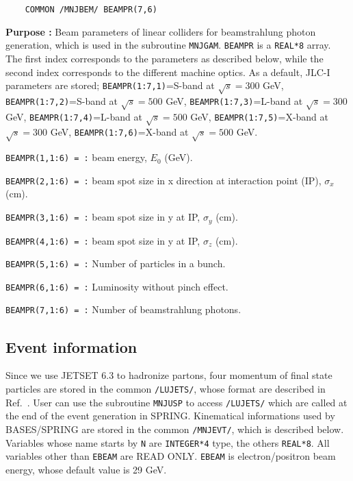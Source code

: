 %
%
\newlength{\MNJBEM}
\settowidth{\MNJBEM}{\tt   COMMON /MNJBEM/ BEAMPR(7,6)}
\begin{verbatim}
    COMMON /MNJBEM/ BEAMPR(7,6)
\end{verbatim}
\vspace{-28pt}
\hspace*{4ex}\fbox{\rule[14pt]{\MNJBEM}{0cm}}
\begin{list}{ }{\parsep=0pt \itemsep=0pt \topsep=0pt }
\item[\bf Purpose :] Beam parameters of linear colliders for
beamstrahlung photon generation,
which is used in the subroutine {\tt MNJGAM}. {\tt BEAMPR} is 
a {\tt REAL*8} array.  The first index corresponds to the parameters as
described below, while the second index corresponds to the different
machine optics.  As a default, JLC-I\cite{JLCI} parameters are
stored; {\tt BEAMPR(1:7,1)}=S-band at $\sqrt{s}=300$ GeV,
{\tt BEAMPR(1:7,2)}=S-band at $\sqrt{s}=500$ GeV,
{\tt BEAMPR(1:7,3)}=L-band at $\sqrt{s}=300$ GeV,
{\tt BEAMPR(1:7,4)}=L-band at $\sqrt{s}=500$ GeV,
{\tt BEAMPR(1:7,5)}=X-band at $\sqrt{s}=300$ GeV,
{\tt BEAMPR(1:7,6)}=X-band at $\sqrt{s}=500$ GeV.
\item[\tt BEAMPR(1,1:6) = :] beam energy, $E_0$ (GeV).
\item[\tt BEAMPR(2,1:6) = :] beam spot size in x direction 
at interaction point (IP), $\sigma_x$ (cm).
\item[\tt BEAMPR(3,1:6) = :] beam spot size in y at IP, $\sigma_y$ (cm).
\item[\tt BEAMPR(4,1:6) = :] beam spot size in y at IP, $\sigma_z$ (cm).
\item[\tt BEAMPR(5,1:6) = :] Number of particles in a bunch.
\item[\tt BEAMPR(6,1:6) = :] Luminosity without  pinch effect.
\item[\tt BEAMPR(7,1:6) = :] Number of beamstrahlung photons.
\end{list}

%
%
\subsection{Event information}
Since we use JETSET 6.3 to hadronize partons, four momentum of final
state particles are stored in the common {\tt /LUJETS/},
whose format are described in Ref.~\cite{LUND63}.
User can use the subroutine {\tt MNJUSP} to access {\tt /LUJETS/}
which are called at the end of the event generation in SPRING.
Kinematical informations used by BASES/SPRING are stored in the
common {\tt /MNJEVT/}, which is described below.
Variables whose name starts by {\tt N} are {\tt INTEGER*4} type, the
others {\tt REAL*8}. 
All variables other than {\tt EBEAM} are READ ONLY.
{\tt EBEAM} is electron/positron beam energy,
whose default value is 29 GeV.

